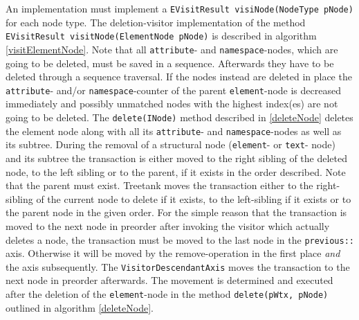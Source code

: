 An implementation must implement a \texttt{EVisitResult visiNode(NodeType pNode)} for each node type. The deletion-visitor implementation of the method \texttt{EVisitResult visitNode(ElementNode pNode)} is described in algorithm \ref{visitElementNode}. Note that all \texttt{attribute}- and \texttt{namespace}-nodes, which are going to be deleted, must be saved in a sequence. Afterwards they have to be deleted through a sequence traversal. If the nodes instead are deleted in place the \texttt{attribute}- and/or \texttt{namespace}-counter of the parent \texttt{element}-node is decreased immediately and possibly unmatched nodes with the highest index(es) are not going to be deleted. The \texttt{delete(INode)} method described in \ref{deleteNode} deletes the element node along with all its \texttt{attribute}- and \texttt{namespace}-nodes as well as its subtree. During the removal of a structural node (\texttt{element}- or \texttt{text}- node) and its subtree the transaction is either moved to the right sibling of the deleted node, to the left sibling or to the parent, if it exists in the order described. Note that the parent must exist. Treetank moves the transaction either to the right-sibling of the current node to delete if it exists, to the left-sibling if it exists or to the parent node in the given order. For the simple reason that the  transaction is moved to the next node in preorder after invoking the visitor which actually deletes a node, the transaction must be moved to the last node in the \texttt{previous::} axis. Otherwise it will be moved by the remove-operation in the first place \emph{and} the axis subsequently. The \texttt{VisitorDescendantAxis} moves the transaction to the next node in preorder afterwards. The movement is determined and executed after the deletion of the \texttt{element}-node in the method \texttt{delete(pWtx, pNode)} outlined in algorithm \ref{deleteNode}.

